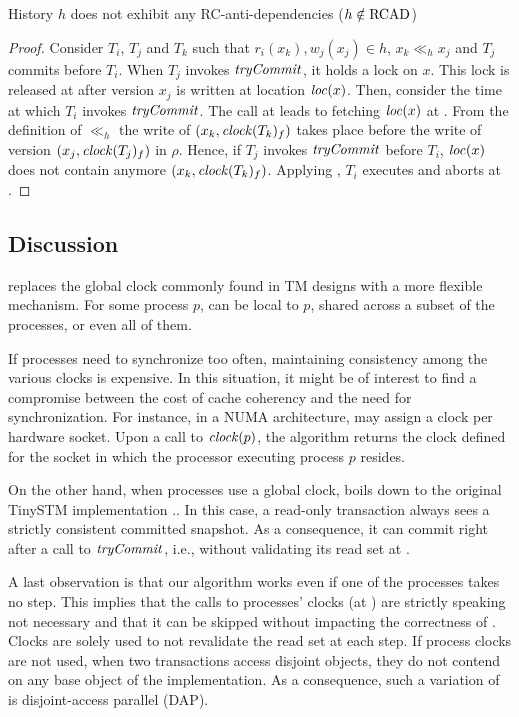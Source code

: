 \begin{proposition}
  History $h$ does not exhibit any RC-anti-dependencies ($h \notin \RCAD$)
\end{proposition}

\begin{proof}
  Consider $T_i$, $T_j$ and $T_k$ such that $r_i(x_k), w_j(x_j) \in h$, $x_k \ll_h x_j$ and $T_j$ commits before $T_i$.
  When $T_j$ invokes $\stmTryCommitFunction$, it holds a lock on $x$.
  This lock is released at  after version $x_j$ is written at location $\locationOf{x}$.
  Then, consider the time at which $T_i$ invokes $\stmTryCommitFunction$.
  The call at  leads to fetching $\locationOf{x}$ at .
  From the definition of $\ll_h$ the write of $(x_k,\clockOf{T_k}_f)$ takes place before the write of version $(x_j,\clockOf{T_j}_f)$ in $\rho$.
  Hence, if $T_j$ invokes $\stmTryCommitFunction$ before $T_i$, $\locationOf{x}$ does not contain anymore $(x_k,\clockOf{T_k}_f)$.
  Applying , $T_i$ executes  and aborts at .
\end{proof}

\subsection{Discussion}

 replaces the global clock commonly found in TM designs with a more flexible mechanism.
For some process $p$,  can be local to $p$, shared across a subset of the processes, or even all of them.

If processes need to synchronize too often, maintaining consistency among the various clocks is expensive.
In this situation, it might be of interest to find a compromise between the cost of cache coherency and the need for synchronization.
For instance, in a NUMA architecture,  may assign a clock per hardware socket.
Upon a call to $\clockOf{p}$, the algorithm returns the clock defined for the socket in which the processor executing process $p$ resides.

On the other hand, when processes use a global clock,  boils down to the original TinySTM implementation \cite{FelberFMR10}..
In this case, a read-only transaction always sees a strictly consistent committed snapshot.
As a consequence, it can commit right after a call to $\stmTryCommitFunction$, i.e., without validating its read set at .

A last observation is that our algorithm works even if one of the processes takes no step.
This implies that the calls to processes' clocks (at ) are strictly speaking not necessary and that it can be skipped without impacting the correctness of .
Clocks are solely used to not revalidate the read set at each step.
If process clocks are not used, when two transactions access disjoint objects, they do not contend on any base object of the implementation.
As a consequence, such a variation of  is disjoint-access parallel (DAP).

